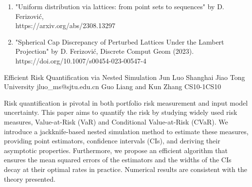 \begin{talk}
	
		
		\begin{enumerate}
			\item  "Uniform distribution via lattices: from point sets to sequences" by D. Ferizovi\'{c},\\
			 https://arxiv.org/abs/2308.13297
			\item  "Spherical Cap Discrepancy of Perturbed Lattices Under the Lambert Projection" by D. Ferizovi\'{c}, Discrete Comput Geom (2023).\\ https://doi.org/10.1007/s00454-023-00547-4
		\end{enumerate}
		\end{talk}

\begin{talk}
  {Efficient Risk Quantification via Nested Simulation}%
  {Jun Luo}%
  {Shanghai Jiao Tong University}%
  {jluo_ms@sjtu.edu.cn}%
  {Guo Liang and Kun Zhang}%
{}{}{CS10-1}{CS10}

Risk quantification is pivotal in both portfolio risk measurement and input model uncertainty. This paper aims to quantify the risk by studying widely used risk measures, Value-at-Risk (VaR) and Conditional Value-at-Risk (CVaR). We introduce a jackknife-based nested simulation method to estimate these measures, providing point estimators, confidence intervals (CIs), and deriving their asymptotic properties. Furthermore, we propose an efficient algorithm that ensures the mean squared errors of the estimators and the widths of the CIs decay at their optimal rates in practice. Numerical results are consistent with the theory presented.
\end{talk}


